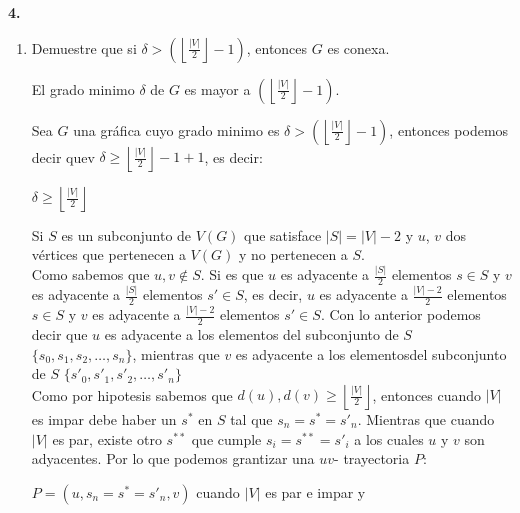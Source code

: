 \documentclass[12pt]{article}
\begin{document}
\vspace{1cm}
%
%
\textbf{4.}
\begin{enumerate}[label=\alph*)]

    \item Demuestre que si $\delta >  \left( \left\lfloor \frac{|V|}{2} \right\rfloor - 1 \right)$, entonces $G$ es conexa.
    \begin{tcolorbox}[title=\textbf{Hipotesis}, colback=red!15!white, colframe=black!]
        El grado minimo $\delta$ de $G$ es mayor a $\left( \left\lfloor \frac{|V|}{2} \right\rfloor - 1 \right)$.
    \end{tcolorbox}

        Sea $G$ una gráfica cuyo grado minimo es $\delta > \left( \left\lfloor \frac{|V|}{2} \right\rfloor - 1 \right)$, entonces
        podemos decir quev $\delta \geq  \left\lfloor \frac{|V|}{2} \right\rfloor - 1 + 1$, es decir:

        \begin{center}
        $\delta \geq  \left\lfloor \frac{|V|}{2} \right\rfloor$
        \end{center}

        Si $S$ es un subconjunto de $ V(G)$ que satisface $|S| = |V| - 2$ y $u$, $v$ dos vértices
        que pertenecen a $V(G)$ y no pertenecen a $S$.\\

        Como sabemos que $u, v \notin S$. Si es que $u$ es adyacente 
        a $\frac{|S|}{2}$ elementos $s \in S$ y $v$ es adyacente a $\frac{|S|}{2}$ elementos $s' \in S$, es decir,
        $u$ es adyacente a $\frac{|V| - 2}{2}$ elementos $s \in S$ y $v$ es adyacente a
        $\frac{|V| - 2}{2}$ elementos $s' \in S$. Con lo anterior podemos decir que $u$ es adyacente a los elementos del 
        subconjunto de $S$ $\{s_0, s_1, s_2, \dots, s_n\}$, mientras que $v$ es adyacente a los elementosdel subconjunto de $S$
        $\{s'_0, s'_1, s'_2, \dots, s'_n\}$\\

        Como por hipotesis sabemos que $d(u), d(v) \geq \left\lfloor \frac{|V|}{2} \right\rfloor$, entonces cuando
        $|V|$ es impar debe haber un $s^{\ast}$ en $S$ tal que $s_n = s^{\ast} = s'_n$.
        Mientras que cuando $|V|$ es par, existe otro $s^{\ast \ast}$ que cumple $s_i = s^{\ast \ast} = s'_i$ a los cuales $u$ y $v$ son adyacentes.
        Por lo que podemos grantizar una $uv$- trayectoria $P$:
        
        \begin{center}
            $P = (u, s_n = s^{\ast} = s'_n, v)$ cuando $|V|$ es par e impar y\\


\end{center}
\end{enumerate}
\end{document}

